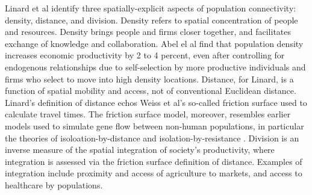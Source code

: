 \documentclass[draft]{article}
\begin{document}
Linard et al \cite{linard12} identify three spatially-explicit aspects of population connectivity: density, distance, and division.  Density refers to spatial concentration of people and resources. Density brings people and firms closer together, and facilitates exchange of knowledge and collaboration.  Abel el al \cite{abel12} find that population density increases economic productivity by 2 to 4 percent, even after controlling for endogenous relationships due to self-selection by more productive individuals and firms who select to move into high density locations.  Distance, for Linard, is a function of spatial mobility and access, not of conventional Euclidean distance.  Linard's definition of distance echos Weiss et al's so-called friction surface used to calculate travel times.  The friction surface model, moreover, resembles earlier models used to simulate gene flow between non-human populations, in particular the theories of isoloation-by-distance \cite{ishida09} and isolation-by-resistance \cite{mcrae06}.  Division is an inverse  measure of the spatial integration of society's productivity, where integration is assessed via the friction surface definition of distance.  Examples of integration include proximity and access of agriculture to markets, and access to healthcare by populations.

\end{document}
